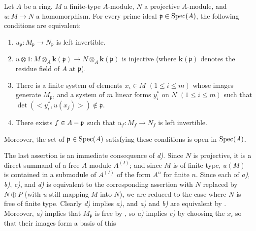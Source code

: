 \begin{corollary}[19.1.12]
\label{0.19.1.12}
Let $A$ be a ring, $M$ a finite-type $A$-module, $N$ a projective $A$-module, and $u:M\to N$ a homomorphism.
For every prime ideal $\mathfrak p\in\operatorname{Spec}(A)$, the following conditions are equivalent:
\begin{enumerate}
  \item[\textup{a)}] $u_{\mathfrak p}:M_{\mathfrak p}\to N_{\mathfrak p}$ is left invertible.
  \item[\textup{b)}] $u\otimes1:M\otimes_A\boldsymbol{k}(\mathfrak p)\to N\otimes_A\boldsymbol{k}(\mathfrak p)$ is injective \textup{(where $\boldsymbol{k}(\mathfrak p)$ denotes the residue field of $A$ at $\mathfrak p$)}.
  \item[\textup{c)}] There is a finite system of elements $x_i\in M$ $(1\leq i\leq m)$ whose images generate $M_{\mathfrak p}$, and a system of $m$ linear forms $y_i^*$ on $N$ $(1\leq i\leq m)$ such that $\det(\mathopen{<}y_i^*,u(x_j)\mathclose{>})\notin\mathfrak p$.
  \item[\textup{d)}] There exists $f\in A-\mathfrak p$ such that $u_f:M_f\to N_f$ is left invertible.
\end{enumerate}
Moreover, the set of $\mathfrak p\in\operatorname{Spec}(A)$ satisfying these conditions is open in $\operatorname{Spec}(A)$.
\end{corollary}

The last assertion is an immediate consequence of \emph{d)}.
Since $N$ is projective, it is a direct summand of a free $A$-module $A^{(I)}$;
and since $M$ is of finite type, $u(M)$ is contained in a submodule of $A^{(I)}$ of the form $A^n$ for finite $n$.
Since each of \emph{a)}, \emph{b)}, \emph{c)}, and \emph{d)} is equivalent to the corresponding assertion with $N$ replaced by $N\oplus P$ (with $u$ still mapping $M$ into $N$), we are reduced to the case where $N$ is free of finite type.
Clearly \emph{d)} implies \emph{a)}, and \emph{a)} and \emph{b)} are equivalent by .
Moreover, \emph{a)} implies that $M_{\mathfrak p}$ is free by , so \emph{a)} implies \emph{c)} by choosing the $x_i$ so that their images form a basis of this


